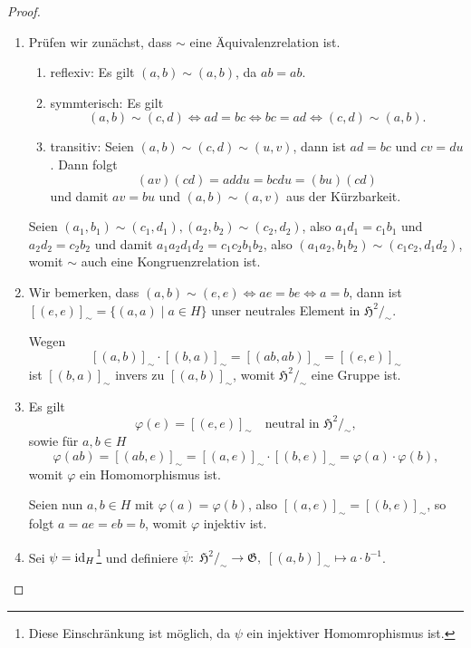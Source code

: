 \begin{proof} {\ }
    \begin{enumerate}
        \item Prüfen wir zunächst, dass $\sim$ eine Äquivalenzrelation ist.
        \begin{enumerate}
            \item reflexiv: Es gilt $(a, b) \sim (a, b)$, da $a b = a b$.
            \item symmterisch: Es gilt
            $$ (a, b) \sim (c, d) \Leftrightarrow a d = b c \Leftrightarrow b c = a d \Leftrightarrow (c, d) \sim (a, b). $$
            \item transitiv: Seien $(a, b) \sim (c, d) \sim (u, v)$, dann ist $ad = bc$ und $cv = du$. Dann folgt
            $$ (av)(cd) = addu = bcdu = (bu)(cd) $$
            und damit $av = bu$ und $(a, b) \sim (a, v)$ aus der Kürzbarkeit.
        \end{enumerate}
        Seien $(a_1, b_1) \sim (c_1, d_1), (a_2, b_2) \sim (c_2, d_2)$, also $a_1 d_1 = c_1 b_1$ und $a_2 d_2 = c_2 b_2$ und damit $a_1 a_2 d_1 d_2 = c_1 c_2 b_1 b_2$, also $(a_1 a_2, b_1 b_2) \sim (c_1 c_2, d_1 d_2)$, womit $\sim$ auch eine Kongruenzrelation ist.

        \item Wir bemerken, dass $(a, b) \sim (e, e) \Leftrightarrow ae = be \Leftrightarrow a = b$, dann ist $[(e,e)]_\sim = \{ (a, a) \mid a \in H \}$ unser neutrales Element in $\mathfrak{H}^2 /_\sim$.
        
        Wegen
        $$ [(a,b)]_\sim \cdot [(b,a)]_\sim = [(ab, ab)]_\sim = [(e,e)]_\sim $$
        ist $[(b,a)]_\sim$ invers zu $[(a,b)]_\sim$, womit $\mathfrak{H}^2 /_\sim$ eine Gruppe ist.

        \item Es gilt
        $$ \varphi(e) = [(e,e)]_\sim \quad \textrm{neutral in } \mathfrak{H}^2 /_\sim, $$
        sowie für $a, b \in H$
        $$ \varphi(ab) = [(ab, e)]_\sim = [(a,e)]_\sim \cdot [(b,e)]_\sim = \varphi(a) \cdot \varphi(b), $$
        womit $\varphi$ ein Homomorphismus ist.

        Seien nun $a,b \in H$ mit $\varphi(a) = \varphi(b)$, also $[(a,e)]_\sim = [(b,e)]_\sim$, so folgt $a = ae = eb = b$, womit $\varphi$ injektiv ist.

        \item Sei \obda $\psi = \operatorname{id}_H$\footnote{Diese Einschränkung ist möglich, da $\psi$ ein injektiver Homomrophismus ist.} und definiere $ \overline{\psi} :\; \mathfrak{H}^2 /_\sim \to \mathfrak{G}, \;[(a,b)]_\sim \mapsto a \cdot b^{-1} $.
        

\end{enumerate}
\end{proof}
